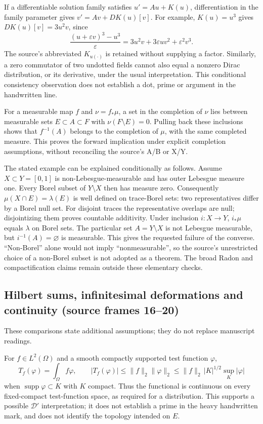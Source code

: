 \documentclass[11pt]{article}
\begin{document}
If a differentiable solution family satisfies $u'=Au+K(u)$, differentiation in the family parameter gives $v'=Av+DK(u)[v]$. For example, $K(u)=u^3$ gives $DK(u)[v]=3u^2v$, since
\[
\frac{(u+\varepsilon v)^3-u^3}{\varepsilon}
=3u^2v+3\varepsilon uv^2+\varepsilon^2v^3.
\]
The source's abbreviated $K_{u(\cdot)}$ is retained without supplying a factor. Similarly, a zero commutator of two undotted fields cannot also equal a nonzero Dirac distribution, or its derivative, under the usual interpretation. This conditional consistency observation does not establish a dot, prime or argument in the handwritten line.

For a measurable map $f$ and $\nu=f_*\mu$, a set in the completion of $\nu$ lies between measurable sets $E\subset A\subset F$ with $\nu(F\setminus E)=0$. Pulling back these inclusions shows that $f^{-1}(A)$ belongs to the completion of $\mu$, with the same completed measure. This proves the forward implication under explicit completion assumptions, without reconciling the source's A/B or X/Y.

The stated example can be explained conditionally as follows. Assume $X\subset Y=[0,1]$ is non-Lebesgue-measurable and has outer Lebesgue measure one. Every Borel subset of $Y\setminus X$ then has measure zero. Consequently $\mu(X\cap E)=\lambda(E)$ is well defined on trace-Borel sets: two representatives differ by a Borel null set. For disjoint traces the representative overlaps are null; disjointizing them proves countable additivity. Under inclusion $i:X\to Y$, $i_*\mu$ equals $\lambda$ on Borel sets. The particular set $A=Y\setminus X$ is not Lebesgue measurable, but $i^{-1}(A)=\varnothing$ is measurable. This gives the requested failure of the converse. “Non-Borel” alone would not imply “nonmeasurable”, so the source's unrestricted choice of a non-Borel subset is not adopted as a theorem. The broad Radon and compactification claims remain outside these elementary checks.


\subsection*{Hilbert sums, infinitesimal deformations and continuity (source frames 16--20)}
These comparisons state additional assumptions; they do not replace manuscript readings.

For $f\in L^2(\Omega)$ and a smooth compactly supported test function $\varphi$,
\[
T_f(\varphi)=\int_\Omega f\varphi,\qquad
|T_f(\varphi)|\leq\|f\|_2\|\varphi\|_2
\leq\|f\|_2\,|K|^{1/2}\sup_K|\varphi|
\]
when $\operatorname{supp}\varphi\subset K$ with $K$ compact. Thus the functional is continuous on every fixed-compact test-function space, as required for a distribution. This supports a possible $\mathcal D'$ interpretation; it does not establish a prime in the heavy handwritten mark, and does not identify the topology intended on $E$.
\end{document}
